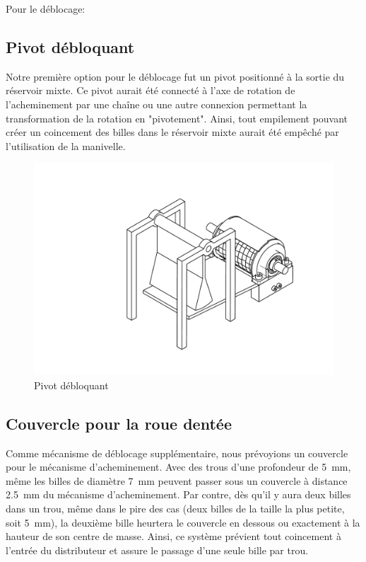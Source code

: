 Pour le déblocage: %
\subsection{Pivot débloquant} 
Notre première option pour le déblocage fut un pivot positionné à la sortie du réservoir mixte. Ce pivot aurait été connecté à l'axe de rotation de l'acheminement par une chaîne ou une autre connexion permettant la transformation de la rotation en "pivotement". Ainsi, tout empilement pouvant créer un coincement des billes dans le réservoir mixte aurait été empêché par l'utilisation de la manivelle.

\begin{figure}
    \centering
    \includegraphics[width=\textwidth]{Graphics/Roue/DRAWING_PIVOT.pdf}
    \caption{Pivot débloquant}
\end{figure}

\subsection{Couvercle pour la roue dentée}
Comme mécanisme de déblocage supplémentaire, nous prévoyions un couvercle pour le mécanisme d'acheminement. Avec des trous d'une profondeur de \SI{5}{\milli\metre}, même les billes de diamètre \SI{7}{\milli\metre} peuvent passer sous un couvercle à distance \SI{2.5}{\milli\metre} du mécanisme d'acheminement. Par contre, dès qu'il y aura deux billes dans un trou, même dans le pire des cas (deux billes de la taille la plus petite, soit \SI{5}{\milli\metre}), la deuxième bille heurtera le couvercle en dessous ou exactement à la hauteur de son centre de masse. Ainsi, ce système prévient tout coincement à l'entrée du distributeur et assure le passage d'une seule bille par trou.

